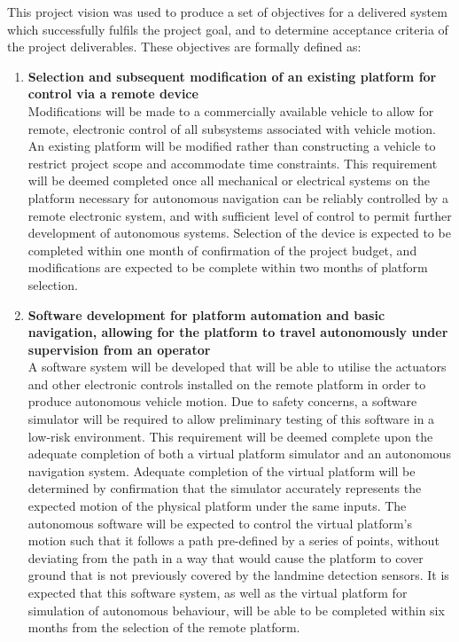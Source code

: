 \documentclass[main.tex]{subfiles}
\begin{document}
This project vision was used to produce a set of objectives for a delivered system which successfully fulfils the project goal, and to determine acceptance criteria of the project deliverables. 
These objectives are formally defined as:

\begin{enumerate}
\item \textbf{Selection and subsequent modification of an existing platform for control via a remote device}\\ 
Modifications will be made to a commercially available vehicle to allow for remote, electronic control of all subsystems associated with vehicle motion.
An existing platform will be modified rather than constructing a vehicle to restrict project scope and accommodate time constraints. 
This requirement will be deemed completed once all mechanical or electrical systems on the platform necessary for autonomous navigation can be reliably controlled by a remote electronic system, and with sufficient level of control to permit further development of autonomous systems. 
Selection of the device is expected to be completed within one month of confirmation of the project budget, and modifications are expected to be complete within two months of platform selection.

\item \textbf{Software development for platform automation and basic navigation, allowing for the platform to travel autonomously under supervision from an operator}\\ 
A software system will be developed that will be able to utilise the actuators and other electronic controls installed on the remote platform in order to produce autonomous vehicle motion. 
Due to safety concerns, a software simulator will be required to allow preliminary testing of this software in a low-risk environment. 
This requirement will be deemed complete upon the adequate completion of both a virtual platform simulator and an autonomous navigation system. 
Adequate completion of the virtual platform will be determined by confirmation that the simulator accurately represents the expected motion of the physical platform under the same inputs.
The autonomous software will be expected to control the virtual platform’s motion such that it follows a path pre-defined by a series of points, without deviating from the path in a way that would cause the platform to cover ground that is not previously covered by the landmine detection sensors. 
It is expected that this software system, as well as the virtual platform for simulation of autonomous behaviour, will be able to be completed within six months from the selection of the remote platform.


\end{enumerate}
\end{document}

